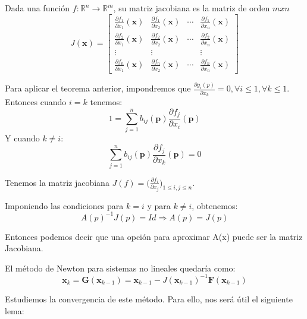 \begin{definition}
	Dada una función $f: \mathbb{R}^n \longrightarrow \mathbb{R}^m$, su matriz jacobiana es la matriz de orden $m x n$  
\[J(\mathbf{x})=\left[\begin{array}{cccc}
	\frac{\partial f_{1}}{\partial x_{1}}(\mathbf{x}) & \frac{\partial f_{1}}{\partial x_{2}}(\mathbf{x}) & \cdots & \frac{\partial f_{1}}{\partial x_{n}}(\mathbf{x}) \\
	\frac{\partial f_{2}}{\partial x_{1}}(\mathbf{x}) & \frac{\partial f_{2}}{\partial x_{2}}(\mathbf{x}) & \cdots & \frac{\partial f_{2}}{\partial x_{n}}(\mathbf{x}) \\
	\vdots & \vdots & & \vdots \\
	\frac{\partial f_{n}}{\partial x_{1}}(\mathbf{x}) & \frac{\partial f_{n}}{\partial x_{2}}(\mathbf{x}) & \cdots & \frac{\partial f_{n}}{\partial x_{n}}(\mathbf{x})
\end{array}\right]\]
\end{definition}

Para aplicar el teorema anterior, impondremos que $\frac{\partial g_i(p)}{\partial x_k} = 0, \forall i \leq 1, \forall k \leq 1$. Entonces cuando $i = k$ tenemos:
\[1=\sum_{j=1}^{n} b_{i j}(\mathbf{p}) \frac{\partial f_{j}}{\partial x_{i}}(\mathbf{p})\]
Y cuando $k \neq i$:
\[\sum_{j=1}^{n} b_{i j}(\mathbf{p}) \frac{\partial f_{j}}{\partial x_{k}}(\mathbf{p})=0\]

Tenemos la matriz jacobiana $J(f) = \Big(\frac{\partial f_i}{\partial x_j} \Big)_{1 \leq i,j \leq n} $.

Imponiendo las condiciones para $k = i$ y para $k \neq i$, obtenemos:
\[A(p)^{-1}J(p) = Id \Rightarrow A(p) = J(p)\]

Entonces podemos decir que una opción para aproximar A(x) puede ser la matriz Jacobiana.

El método de Newton para sistemas no lineales quedaría como:
\[\mathbf{x}_{k}=\mathbf{G}\left(\mathbf{x}_{k-1}\right)=\mathbf{x}_{k-1}-J\left(\mathbf{x}_{k-1}\right)^{-1} \mathbf{F}\left(\mathbf{x}_{k-1}\right)\]

Estudiemos la convergencia de este método. Para ello, nos será útil el siguiente lema:


